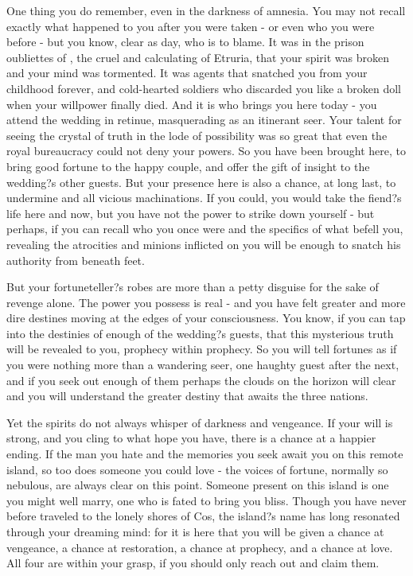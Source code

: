 \documentclass[char]{Kos}
\begin{document}
One thing you do remember, even in the darkness of amnesia. You may not recall exactly what happened to you after you were taken - or even who you were before - but you know, clear as day, who is to blame. It was in the prison oubliettes of \cEtruriaKing{}, the cruel and calculating \cEtruriaKing{\monarch} of Etruria, that your spirit was broken and your mind was tormented. It was \cEtruriaKing{\their} agents that snatched you from your childhood forever, and \cEtruriaKing{\their} cold-hearted soldiers who discarded you like a broken doll when your willpower finally died. And it is \cEtruriaKing{} who brings you here today - you attend the wedding in \cEtruriaKing{\their} retinue, masquerading as an itinerant seer. Your talent for seeing the crystal of truth in the lode of possibility was so great that even the royal bureaucracy could not deny your powers. So you have been brought here, to bring good fortune to the happy couple, and offer the gift of insight to the wedding?s other guests. But your presence here is also a chance, at long last, to undermine \cEtruriaKing{\Monarch} \cEtruriaKing{} and all \cEtruriaKing{\their} vicious machinations. If you could, you would take the fiend?s life here and now, but you have not the power to strike \cEtruriaKing{\them} down yourself - but perhaps, if you can recall who you once were and the specifics of what befell you, revealing the atrocities \cEtruriaKing{} and \cEtruriaKing{\their} minions inflicted on you will be enough to snatch his authority from beneath \cEtruriaKing{\their} feet.

But your fortuneteller?s robes are more than a petty disguise for the sake of revenge alone. The power you possess is real - and you have felt greater and more dire destines moving at the edges of your consciousness. You know, if you can tap into the destinies of enough of the wedding?s guests, that this mysterious truth will be revealed to you, prophecy within prophecy. So you will tell fortunes as if you were nothing more than a wandering seer, one haughty guest after the next, and if you seek out enough of them perhaps the clouds on the horizon will clear and you will understand the greater destiny that awaits the three nations.

Yet the spirits do not always whisper of darkness and vengeance. If your will is strong, and you cling to what hope you have, there is a chance at a happier ending. If the man you hate and the memories you seek await you on this remote island, so too does someone you could love - the voices of fortune, normally so nebulous, are always clear on this point. Someone present on this island is one you might well marry, one who is fated to bring you bliss. Though you have never before traveled to the lonely shores of Cos, the island?s name has long resonated through your dreaming mind: for it is here that you will be given a chance at vengeance, a chance at restoration, a chance at prophecy, and a chance at love. All four are within your grasp, if you should only reach out and claim them. 
\end{document}
